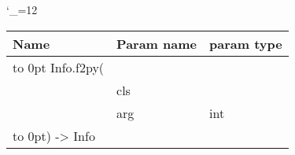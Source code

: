 \begingroup \catcode`\_=12 \tt
\begin{tabular}{lll}
\toprule
\textrm{Name}&\textrm{Param name}&\textrm{param type}\\
\midrule
\hbox to 0pt {Info.f2py(\hss}\\
& cls\\
& arg & int\\
\hbox to 0pt{) -> Info\hss}\\
\bottomrule
\end{tabular}
\endgroup
